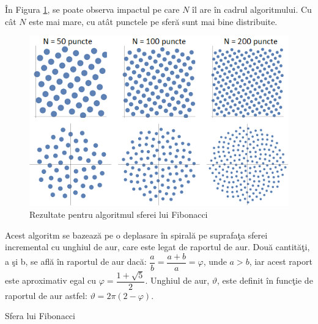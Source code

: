 	\^{I}n Figura \ref{Fig13}, se poate observa impactul pe care $N$ \^{i}l are \^{i}n cadrul algoritmului. Cu c\^{a}t $N$ este mai mare, cu at\^{a}t punctele pe sfer\u{a} sunt mai bine distribuite.
	\bigskip
	
	\begin{figure}[!htb]
		\centering
		\includegraphics[width=12cm]{imagini/fibo.png}
		\caption{Rezultate pentru algoritmul sferei lui Fibonacci\cite{fibo}}
		\label{Fig13}
	\end{figure}
	
	Acest algoritm se bazeaz\u{a} pe o deplasare \^{i}n spiral\u{a} pe suprafa\c{t}a sferei incremental cu unghiul de aur, care este legat de raportul de aur. Dou\u{a} cantit\u{a}\c{t}i, a \c{s}i b, se afl\u{a} \^{i}n raportul de aur dac\u{a}: $\dfrac{a}{b} = \dfrac{a+b}{a} = \varphi$, unde $a>b$, iar acest raport este aproximativ egal cu $\varphi = \dfrac{1+\sqrt{5}}{2}$. Unghiul de aur, $\vartheta$, este definit \^{i}n func\c{t}ie de raportul de aur astfel: $\vartheta = 2\pi(2- \varphi)$. 
	\bigskip
	
	\begin{algorithm}
		\caption{Sfera lui Fibonacci}
		\label{fiboLabel}
	\begin{algorithmic}[1]	
		\EndFor
		\EndProcedure
	\end{algorithmic}
	\end{algorithm}

